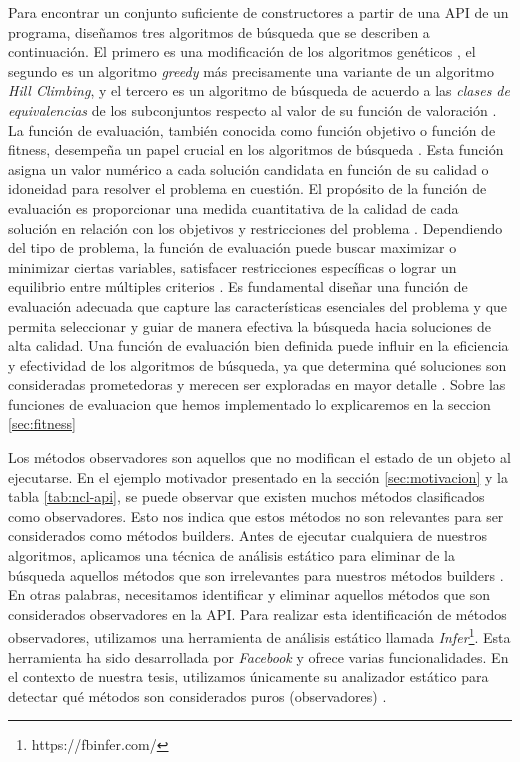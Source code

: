 \label{sec:algorithms}
Para encontrar un conjunto suficiente  de constructores a partir
de una API de un programa, diseñamos tres algoritmos de búsqueda que se
describen a continuación. El primero es una modificación de los algoritmos
genéticos , el segundo es un algoritmo \emph{greedy}
más precisamente una variante de un algoritmo \emph{Hill Climbing}, y el tercero
es un algoritmo de búsqueda de acuerdo a las \emph{clases de equivalencias}  de
los subconjuntos respecto al valor de su función de valoración .
La función de evaluación, también conocida como función objetivo o función de
fitness, desempeña un papel crucial en los algoritmos de búsqueda
. Esta función asigna un valor numérico a cada solución candidata
en función de su calidad o idoneidad  para resolver el
problema en cuestión. El propósito de la función de evaluación es proporcionar
una medida cuantitativa de la calidad de cada solución en relación con los
objetivos y restricciones del problema . Dependiendo del tipo de problema, la función de
evaluación puede buscar maximizar o minimizar ciertas variables, satisfacer
restricciones específicas o lograr un equilibrio entre múltiples criterios
. Es fundamental diseñar una función de evaluación adecuada que capture las
características esenciales del problema y que permita seleccionar y guiar de
manera efectiva la búsqueda hacia soluciones de alta calidad. Una función de evaluación bien
definida puede influir en la eficiencia y efectividad de los algoritmos de
búsqueda, ya que determina qué soluciones son consideradas prometedoras y
merecen ser exploradas en mayor detalle . Sobre las funciones de evaluacion que hemos implementado lo explicaremos en la seccion \ref{sec:fitness}


Los métodos observadores son aquellos que no modifican el estado de un objeto al
ejecutarse. En el ejemplo motivador presentado en la sección
\ref{sec:motivacion} y la tabla \ref{tab:ncl-api}, se puede observar que existen
muchos métodos clasificados como observadores. Esto nos indica que estos métodos
no son relevantes para ser considerados como métodos builders. Antes de ejecutar
cualquiera de nuestros algoritmos, aplicamos una técnica de análisis estático
para eliminar de la búsqueda aquellos métodos que son irrelevantes para nuestros
métodos builders . En otras palabras, necesitamos identificar y eliminar aquellos métodos que son considerados observadores en la API.
Para realizar esta identificación de métodos observadores, utilizamos una
herramienta de análisis estático llamada
\emph{Infer}\footnote{https://fbinfer.com/}. Esta herramienta ha sido
desarrollada por \emph{Facebook} y ofrece varias funcionalidades. En el contexto
de nuestra tesis, utilizamos únicamente su analizador estático para detectar qué
métodos son considerados puros (observadores) .

